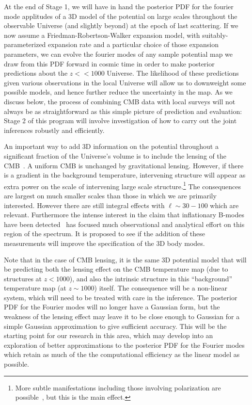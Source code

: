 \documentclass[psfig,12pt]{article}
\def\ni{\noindent}
\begin{document}
{At the end of Stage 1, we will have in hand the posterior PDF for the
fourier mode applitudes of a 3D model of the potential on large scales
throughout the observable Universe (and slightly beyond) at the epoch of
last scattering. If we now assume a  Friedman-Robertson-Walker expansion
model, with suitably-parameterized expansion rate and a particular
choice of those expansion parameters,  we can evolve the fourier modes
of any sample potential map we draw  from this PDF forward in cosmic
time in order to make posterior  predictions about the
$z << 1000$ Universe. The likelihood of these predictions given various
observations in the local Universe will allow us to downweight some
possible models, and hence further reduce the uncertainty in the map.
As we discuss below, the process of combining CMB data with local surveys
will not always be as straightforward as this simple picture of
prediction and evaluation: Stage 2 of this program will involve
investigation of how to carry out the joint inferences robustly and
efficiently.

\ni{\bf CMB Lensing and ISW Measurements:}
An important way to add 3D information on the potential throughout a
significant fraction of the Universe's volume is to include the lensing
of the CMB~\cite{Planck2015cosmopara}. A uniform CMB is unchanged by
gravitational lensing. However, if there is a gradient in the background
temperature, intervening structure will appear as extra power on the
scale of intervening large scale structure.\footnote{More subtle
manifestations including those involving polarization are
possible~\cite{Hu:2002}, but this is the main effect.} The consequences
are largest on much smaller scales than those in which we are primarily
interested. However there are still integral effects with
$\ell\sim30-100$ which are relevant. Furthermore the intense interest in
the claim that inflationary B-modes have been
detected~\cite{Planck2015cosmopara}  has focused much observational and
analytical effort on this region of the spectrum. It is proposed to see
if the addition of these measurements will improve the specification of
the 3D body modes.

Note that in the case of CMB lensing, it is the same 3D potential model
that will be predicting both the lensing effect on the CMB temperature
map (due to structures at $z < 1000$), and  also the intrinsic structure
in this ``background'' temperature map (at $z \sim 1000$) itself. The
consequence will be a non-linear system, which will need to be treated
with care in the inference. The posterior PDF for the Fourier modes will
no longer have a Gaussian form, but the weakness of the lensing effect
may leave it to be close enough to Gaussian for a simple Gaussian
approximation to give sufficient accuracy. This will be the starting
point for our research in this area, which may develop into an
exploration  of better approximations to the posterior PDF for the
Fourier modes  which retain as much of the the computational efficiency
as the linear model as possible.

}
\end{document}

